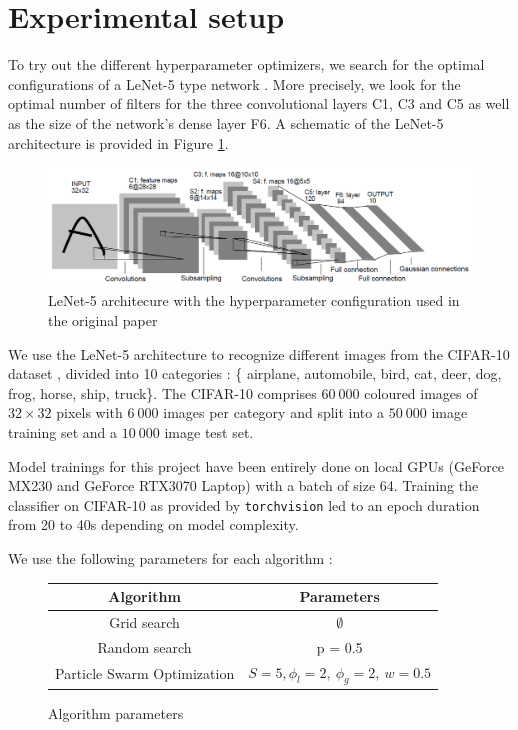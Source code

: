 \documentclass[a4 paper,11pt,2]{article}
\begin{document}
\section{Experimental setup}
To try out the different hyperparameter optimizers, we search for the optimal configurations of a LeNet-5 type network \cite{lecunGradientbasedLearningApplied1998}. More precisely, we look for the optimal number of filters for the three convolutional layers C1, C3 and C5 as well as the size of the network's dense layer F6. A schematic of the LeNet-5 architecture is provided in Figure \ref{fig:lenet}.

\begin{figure}[h]
\centering
\includegraphics[width = \linewidth]{ln5.png}
\caption{LeNet-5 architecure with the hyperparameter configuration used in the original paper}
\label{fig:lenet}
\end{figure}

We use the LeNet-5 architecture to recognize different images from the CIFAR-10 dataset \cite{krizhevskyLearningMultiplyeLayers2009}, divided into 10 categories : \{ airplane, automobile, bird, cat, deer, dog, frog, horse, ship, truck\}. The CIFAR-10 comprises $60\ 000$ coloured images of $32\times32$ pixels with $6\ 000$ images per category and split into a $50\ 000$ image training set and a $10\ 000$ image test set.

Model trainings for this project have been entirely done on local GPUs (GeForce MX230 and GeForce RTX3070 Laptop) with a batch of size 64. Training the classifier on CIFAR-10 as provided by \verb+torchvision+ led to an epoch duration from 20 to 40s depending on model complexity.

We use the following parameters for each algorithm :
\begin{figure}[h]
\centering
\begin{tabular}{|c|c|}
\hline Algorithm & Parameters \\
\hline Grid search & $\emptyset$ \\
Random search & p = 0.5 \\
Particle Swarm Optimization & $S=5,\phi_l = 2,\ \phi_g = 2,\ w=0.5$\\ \hline
\end{tabular}
\label{tab:parameters}
\caption{Algorithm parameters}
\end{figure}
\end{document}
